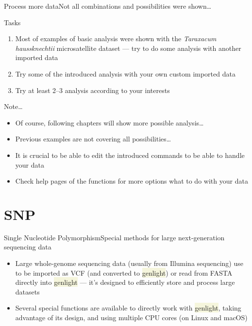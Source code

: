 \documentclass[compress, xelatex, 11pt, xcolor=svgnames, aspectratio=169,
	hyperref={
		bookmarks=true,
		unicode=true,
		colorlinks=true,
		pdftitle={Molecular data in R},
		plainpages=false,
		pdfauthor={Vojtech Zeisek},
		pdfsubject={Course about phylogeny and evolution in R},
		pdfcreator={XeLaTeX},
		pdfkeywords={R, evolution, phylogeny, molecular data},
		linkcolor=Crimson, %
		anchorcolor=Magenta, %
		citecolor=Magenta, %
		filecolor=Magenta, %
		menucolor=Magenta, %
		urlcolor=DodgerBlue, %
		},
	url={hyphens, lowtilde} %
	]{beamer}
\renewcommand{\texttt}[1]{\colorbox{Beige}{{\ttfamily #1}}}
\begin{document}
\begin{frame}{Process more data}{Not all combinations and possibilities were shown\ldots}
	\begin{exampleblock}{Tasks}
		\begin{enumerate}
			\item Most of examples of basic analysis were shown with the \textit{Taraxacum haussknechtii} microsatellite dataset --- try to do some analysis with another imported data
			\item Try some of the introduced analysis with your own custom imported data
			\item Try at least 2--3 analysis according to your interests
		\end{enumerate}
	\end{exampleblock}
	\begin{block}{Note\ldots}
		\begin{itemize}
			\item Of course, following chapters will show more possible analysis\ldots
			\item Previous examples are not covering all possibilities\ldots
			\item It is crucial to be able to edit the introduced commands to be able to handle your data
			\item Check help pages of the functions for more options what to do with your data
		\end{itemize}
	\end{block}
\end{frame}

\section{SNP}

\begin{frame}{Single Nucleotide Polymorphism}{Special methods for large next-generation sequencing data}
	\tableofcontents[currentsection, sectionstyle=show/hide, hideothersubsections]
	\begin{itemize}
		\item Large whole-genome sequencing data (usually from Illumina sequencing) use to be imported as VCF (and converted to \texttt{genlight}) or read from FASTA directly into \texttt{genlight} --- it's designed to efficiently store and process large datasets
		\item Several special functions are available to directly work with \texttt{genlight}, taking advantage of its design, and using multiple CPU cores (on Linux and macOS)
	\end{itemize}
\end{frame}
\end{document}
